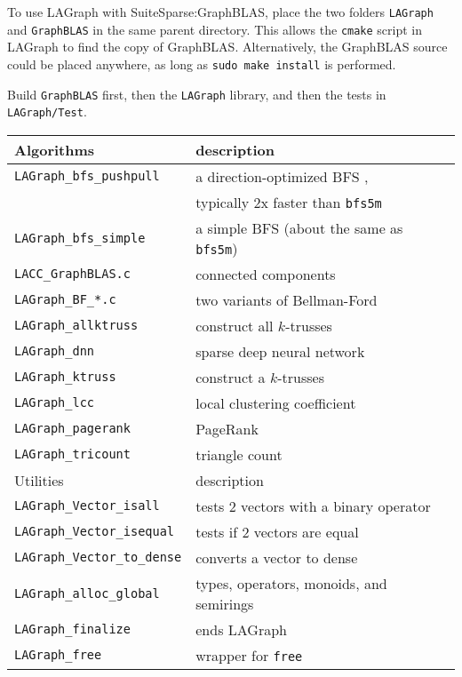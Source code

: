 \documentclass[12pt]{article}
\begin{document}
To use LAGraph with SuiteSparse:GraphBLAS, place the two folders \verb'LAGraph'
and \verb'GraphBLAS' in the same parent directory.  This allows the
\verb'cmake' script in LAGraph to find the copy of GraphBLAS.  Alternatively,
the GraphBLAS source could be placed anywhere, as long as
\verb'sudo make install' is performed.

Build \verb'GraphBLAS' first, then the \verb'LAGraph' library, and then the
tests in \verb'LAGraph/Test'.

\vspace{0.1in}
{\small
\begin{tabular}{ll}
\hline
\hline
Algorithms & description \\
\hline
\hline
\verb'LAGraph_bfs_pushpull' & a direction-optimized BFS
                                \cite{Beamer:2012:DOB,Yang:2018:IPE}, \\
                            & typically 2x faster than \verb'bfs5m' \\
\verb'LAGraph_bfs_simple'   & a simple BFS (about the same as \verb'bfs5m') \\
\verb'LACC_GraphBLAS.c'     & connected components \\
\verb'LAGraph_BF_*.c'       & two variants of Bellman-Ford \\
\verb'LAGraph_allktruss'    & construct all $k$-trusses \\
\verb'LAGraph_dnn'          & sparse deep neural network \\
\verb'LAGraph_ktruss'       & construct a $k$-trusses \\
\verb'LAGraph_lcc'          & local clustering coefficient \\
\verb'LAGraph_pagerank'     & PageRank \\
\verb'LAGraph_tricount'     & triangle count \\
\hline
\hline
Utilities & description \\
\hline
\hline
\verb'LAGraph_Vector_isall'     & tests 2 vectors with a binary operator \\
\verb'LAGraph_Vector_isequal'   & tests if 2 vectors are equal \\
\verb'LAGraph_Vector_to_dense'  & converts a vector to dense \\
\verb'LAGraph_alloc_global'     & types, operators, monoids, and semirings \\
\verb'LAGraph_finalize'         & ends LAGraph \\
\verb'LAGraph_free'             & wrapper for \verb'free' \\

\end{tabular}}
\end{document}
